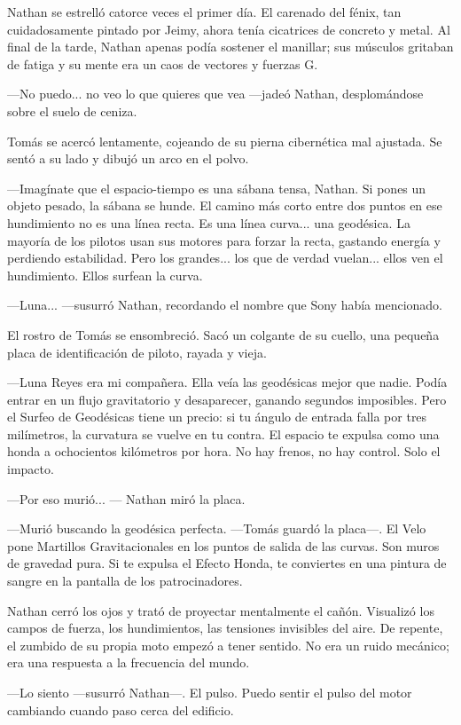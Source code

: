 \documentclass[12pt,a4paper]{book}
\begin{document}
Nathan se estrelló catorce veces el primer día. El carenado del fénix, tan cuidadosamente pintado por Jeimy, ahora tenía cicatrices de concreto y metal. Al final de la tarde, Nathan apenas podía sostener el manillar; sus músculos gritaban de fatiga y su mente era un caos de vectores y fuerzas G.

---No puedo... no veo lo que quieres que vea ---jadeó Nathan, desplomándose sobre el suelo de ceniza.

Tomás se acercó lentamente, cojeando de su pierna cibernética mal ajustada. Se sentó a su lado y dibujó un arco en el polvo.

---Imagínate que el espacio-tiempo es una sábana tensa, Nathan. Si pones un objeto pesado, la sábana se hunde. El camino más corto entre dos puntos en ese hundimiento no es una línea recta. Es una línea curva... una geodésica. La mayoría de los pilotos usan sus motores para forzar la recta, gastando energía y perdiendo estabilidad. Pero los grandes... los que de verdad vuelan... ellos ven el hundimiento. Ellos surfean la curva.

---Luna... ---susurró Nathan, recordando el nombre que Sony había mencionado.

El rostro de Tomás se ensombreció. Sacó un colgante de su cuello, una pequeña placa de identificación de piloto, rayada y vieja.

---Luna Reyes era mi compañera. Ella veía las geodésicas mejor que nadie. Podía entrar en un flujo gravitatorio y desaparecer, ganando segundos imposibles. Pero el Surfeo de Geodésicas tiene un precio: si tu ángulo de entrada falla por tres milímetros, la curvatura se vuelve en tu contra. El espacio te expulsa como una honda a ochocientos kilómetros por hora. No hay frenos, no hay control. Solo el impacto.

---Por eso murió... --- Nathan miró la placa.

---Murió buscando la geodésica perfecta. ---Tomás guardó la placa---. El Velo pone Martillos Gravitacionales en los puntos de salida de las curvas. Son muros de gravedad pura. Si te expulsa el Efecto Honda, te conviertes en una pintura de sangre en la pantalla de los patrocinadores.

Nathan cerró los ojos y trató de proyectar mentalmente el cañón. Visualizó los campos de fuerza, los hundimientos, las tensiones invisibles del aire. De repente, el zumbido de su propia moto empezó a tener sentido. No era un ruido mecánico; era una respuesta a la frecuencia del mundo.

---Lo siento ---susurró Nathan---. El pulso. Puedo sentir el pulso del motor cambiando cuando paso cerca del edificio.
\end{document}

